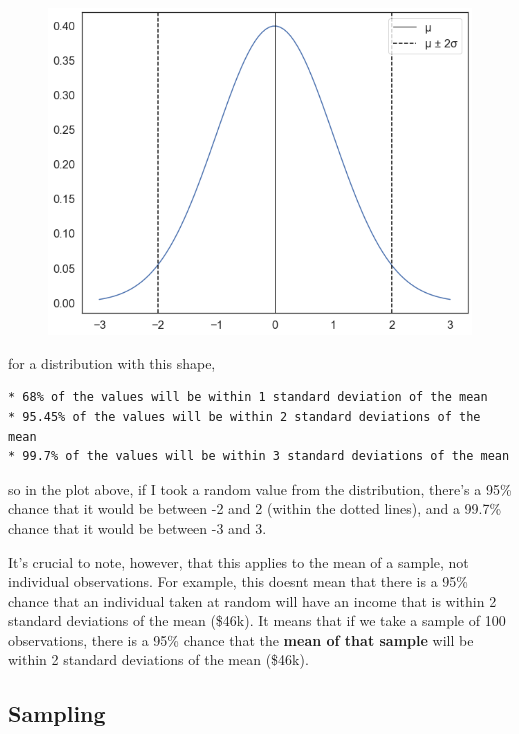 \documentclass[
  letterpaper,
  DIV=11,
  numbers=noendperiod]{scrreprt}
\begin{document}
\begin{figure}[H]

{\centering \includegraphics{notebooks/W07. Distributions and Basic Statistics_files/figure-pdf/cell-22-output-1.png}

}

\end{figure}

for a distribution with this shape,

\begin{verbatim}
* 68% of the values will be within 1 standard deviation of the mean
* 95.45% of the values will be within 2 standard deviations of the mean
* 99.7% of the values will be within 3 standard deviations of the mean
\end{verbatim}

so in the plot above, if I took a random value from the distribution,
there's a 95\% chance that it would be between -2 and 2 (within the
dotted lines), and a 99.7\% chance that it would be between -3 and 3.

It's crucial to note, however, that this applies to the mean of a
sample, not individual observations. For example, this doesnt mean that
there is a 95\% chance that an individual taken at random will have an
income that is within 2 standard deviations of the mean (\$46k). It
means that if we take a sample of 100 observations, there is a 95\%
chance that the \textbf{mean of that sample} will be within 2 standard
deviations of the mean (\$46k).

\hypertarget{sampling}{%
\subsection{Sampling}\label{sampling}}
\end{document}
